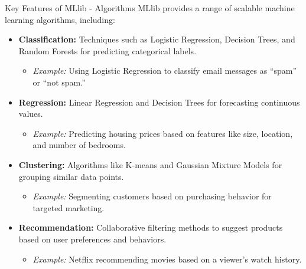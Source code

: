 \documentclass[aspectratio=169]{beamer}
\begin{document}
\begin{frame}[fragile]{Key Features of MLlib - Algorithms}
    MLlib provides a range of scalable machine learning algorithms, including:
    \begin{itemize}
        \item \textbf{Classification:} Techniques such as Logistic Regression, Decision Trees, and Random Forests for predicting categorical labels.
        \begin{itemize}
            \item \textit{Example:} Using Logistic Regression to classify email messages as “spam” or “not spam.”
        \end{itemize}
        
        \item \textbf{Regression:} Linear Regression and Decision Trees for forecasting continuous values.
        \begin{itemize}
            \item \textit{Example:} Predicting housing prices based on features like size, location, and number of bedrooms.
        \end{itemize}
        
        \item \textbf{Clustering:} Algorithms like K-means and Gaussian Mixture Models for grouping similar data points.
        \begin{itemize}
            \item \textit{Example:} Segmenting customers based on purchasing behavior for targeted marketing.
        \end{itemize}
        
        \item \textbf{Recommendation:} Collaborative filtering methods to suggest products based on user preferences and behaviors.
        \begin{itemize}
            \item \textit{Example:} Netflix recommending movies based on a viewer's watch history.
        \end{itemize}
    \end{itemize}
\end{frame}
\end{document}
